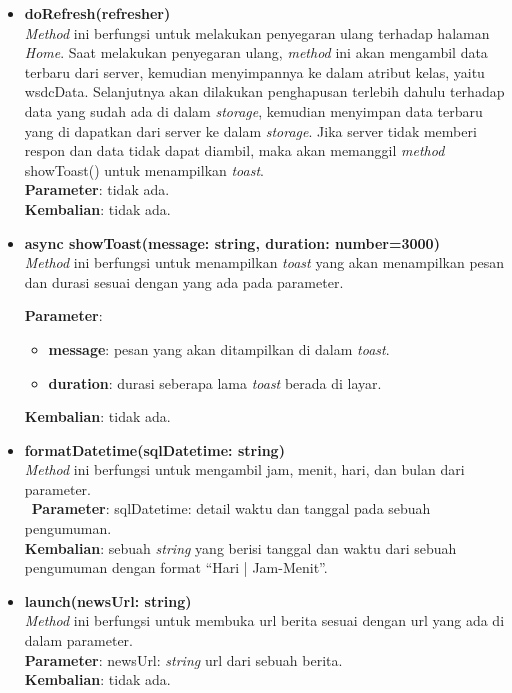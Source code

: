 \begin{enumerate}
\begin{itemize}
		\item \textbf{doRefresh(refresher)} \\
			\textit{Method} ini berfungsi untuk melakukan penyegaran ulang terhadap halaman \textit{Home}. Saat melakukan penyegaran ulang, \textit{method} ini akan mengambil data terbaru dari server, kemudian menyimpannya ke dalam atribut kelas, yaitu wsdcData. Selanjutnya akan dilakukan penghapusan terlebih dahulu terhadap data yang sudah ada di dalam \textit{storage}, kemudian menyimpan data terbaru yang di dapatkan dari server ke dalam \textit{storage}. Jika server tidak memberi respon dan data tidak dapat diambil, maka akan memanggil \textit{method} showToast() untuk menampilkan \textit{toast}. \\
			\textbf{Parameter}: tidak ada. \\
			\textbf{Kembalian}: tidak ada.
			
		\item \textbf{async showToast(message: string, duration: number=3000)}\\
			\textit{Method} ini berfungsi untuk menampilkan \textit{toast} yang akan menampilkan pesan dan durasi sesuai dengan yang ada pada parameter.
			
			\textbf{Parameter}:
			\begin{itemize}
				\item \textbf{message}: pesan yang akan ditampilkan di dalam \textit{toast}.
				\item \textbf{duration}: durasi seberapa lama \textit{toast} berada di layar.
			\end{itemize}
			\textbf{Kembalian}: tidak ada.
			
		\item \textbf{formatDatetime(sqlDatetime: string)}\\
			\textit{Method} ini berfungsi untuk mengambil jam, menit, hari, dan bulan dari parameter. \\\
			\textbf{Parameter}: sqlDatetime: detail waktu dan tanggal pada sebuah pengumuman. \\
			\textbf{Kembalian}: sebuah \textit{string} yang berisi tanggal dan waktu dari sebuah pengumuman dengan format ``Hari | Jam-Menit''.
			
		\item \textbf{launch(newsUrl: string)}\\
			\textit{Method} ini berfungsi untuk membuka url berita sesuai dengan url yang ada di dalam parameter. \\
			\textbf{Parameter}: newsUrl: \textit{string} url dari sebuah berita. \\
			\textbf{Kembalian}: tidak ada.
			

\end{itemize}
\end{enumerate}
